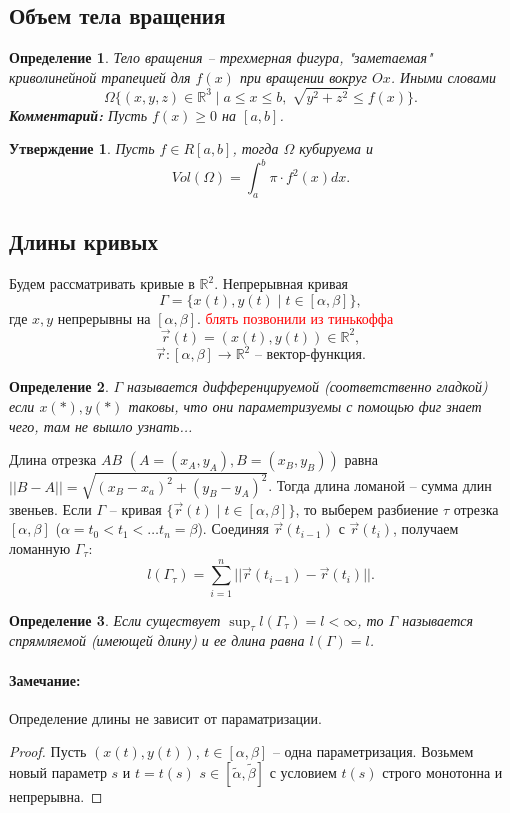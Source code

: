 \documentclass{article}
\theoremstyle{plain}
\newtheorem{claim}{Утверждение}
\newtheorem{definition}{Определение}
\theoremstyle{definition}
\theoremstyle{remark}
\renewcommand{\*}{\cdot}
\begin{document}
\subsection{Объем тела вращения}
\begin{definition}
Тело вращения -- трехмерная фигура, "заметаемая" криволинейной трапецией для $f(x)$ при вращении вокруг $Ox$. Иными словами
$$\Omega \Big\{ (x, y, z)\in \mathbb{R}^3 \;\Big|\; a\leq x\leq b,\; \sqrt{y^2+z^2}\leq f(x) \Big\}.$$
\textbf{Комментарий:} Пусть $f(x) \geq 0$ на $[a, b]$.
\end{definition}

\begin{claim}
Пусть $f\in R[a, b]$, тогда $\Omega$ кубируема и 
$$Vol(\Omega) = \int_a^b \pi\cdot f^2(x)dx.$$
\end{claim}

\subsection{Длины кривых}
Будем рассматривать кривые в $\mathbb{R}^2$. 
Непрерывная кривая $$\Gamma = \Big\{x(t), y(t)\;\Big|\;t\in[\alpha, \beta]\Big\},$$ где $x, y$ непрерывны на $[\alpha, \beta]$.  
\textcolor{red}{блять позвонили из тинькоффа} 
$$\overrightarrow{r}(t) = (x(t), y(t)) \in \mathbb{R}^2,$$
$$\overrightarrow{r} : [\alpha, \beta] \rightarrow \mathbb{R}^2 \text{ -- вектор-функция.}$$
\begin{definition}
$\Gamma$ называется дифференцируемой (соответственно гладкой) если $x(*), y(*)$ таковы, что они параметризуемы с помощью фиг знает чего, там не вышло узнать...
\end{definition}


Длина отрезка $AB$ $(A=(x_A, y_A), B = (x_B, y_B))$ равна $||B-A|| = \sqrt{(x_B -x_a)^2 + (y_B-y_A)^2}$.
Тогда длина ломаной -- сумма длин звеньев.
Если $\Gamma$ -- кривая $\Big\{\overrightarrow{r}(t)\; | \; t \in [\alpha, \beta]\Big\}$, то выберем разбиение $\tau$ отрезка $[\alpha, \beta]$ ($\alpha = t_0<t_1<\ldots t_{n} =\beta$).
Соединяя $\overrightarrow{r}(t_{i-1})$ с $\overrightarrow{r}(t_i)$, получаем ломанную $\Gamma_{\tau}$:
$$l(\Gamma_{\tau}) = \sum_{i=1}^{n} ||\overrightarrow{r}(t_{i-1}) - \overrightarrow{r}(t_i) ||.$$

\begin{definition}
Если существует $\sup_{\tau} l(\Gamma_{\tau}) = l< \infty$, то $\Gamma$ называется спрямляемой (имеющей длину) и ее длина равна $l(\Gamma) = l$.
\end{definition}

\paragraph{Замечание:} Определение длины не зависит от параматризации. 
\begin{proof}
Пусть $(x(t), y(t))$, $t\in [\alpha, \beta]$ -- одна параметризация. Возьмем новый параметр $s$ и $t=t(s)$ $s\in [\widetilde{\alpha}, \widetilde{\beta}]$ с условием $t(s)$ строго монотонна и непрерывна. 
\end{proof}
\end{document}
